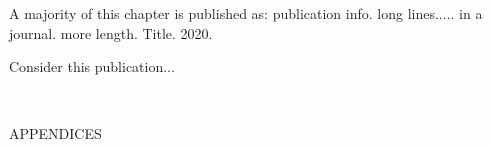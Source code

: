 \documentclass[12pt]{report} %
\numberwithin{equation}{subsection}
\numberwithin{figure}{chapter} %
\theoremstyle{numbernote}
\theoremstyle{nonumber}
\theoremstyle{nonumbernonote}
\theoremstyle{nonote}
\begin{document}
\vspace{12.96pt} %
{

    A majority of this chapter is published as: publication info. long lines..... in a journal. more length. Title. 2020. \par %
}
\vspace{12.96pt} %

Consider this publication... \lipsum[1]


\pagebreak



\titleformat{\chapter}[display]{\centering}{\MakeUppercase{\chaptertitlename} \ \thechapter}{0pt}{}%
\appendix

~
\vfill

{\centering APPENDICES \par} %


\vfill
~
\end{document}
